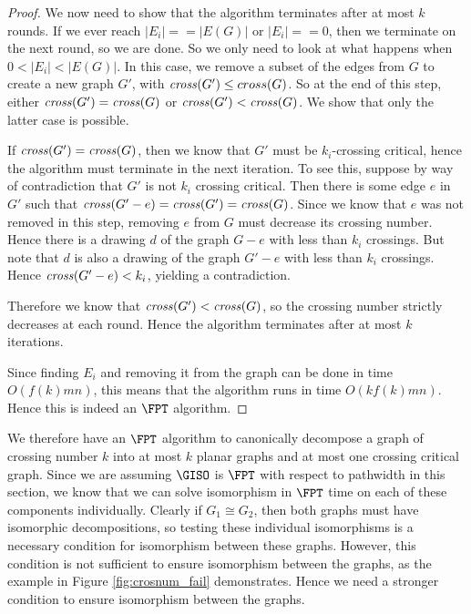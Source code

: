 \documentclass[11pt]{report}
\newcommand{\cross}{\mbox{\emph{cross}}}
\begin{document}
\begin{proof}
We now need to show that the algorithm terminates after at most $k$ rounds. If we ever reach $|E_i|==|E(G)|$ or $|E_i|==0$, then we terminate on the next round, so we are done. So we only need to look at what happens when  $0<|E_i|<|E(G)|$.  In this case,  we remove a subset of the edges from $G$ to create a new graph $G'$, with $\cross(G')\leq cross(G)$. So at the end of this step, either $\cross(G')=\cross(G)$ or $\cross(G')<\cross(G)$. We show that only the latter case is possible.

If $\cross(G')=\cross(G)$, then we know that $G'$ must be $k_i$-crossing critical, hence the algorithm must terminate in the next iteration. To see this, suppose by way of contradiction that $G'$ is not $k_i$ crossing critical. Then there is some edge $e$ in $G'$ such that $\cross(G'-e)=\cross(G')=\cross(G)$. Since we know that $e$ was not removed in this step, removing $e$ from $G$ must decrease its crossing number. Hence there is a drawing $d$ of the graph $G-e$ with less than $k_i$ crossings. But note that $d$ is also a drawing of the graph $G'-e$ with less than $k_i$ crossings. Hence $\cross(G'-e)<k_i$, yielding a contradiction. 


Therefore we know that $\cross(G')<\cross(G)$, so the crossing number strictly decreases at each round. Hence the algorithm terminates after at most $k$ iterations.

Since finding $E_i$ and removing it from the graph can be done in time $O(f(k)mn)$, this means that the algorithm runs in time $O(kf(k)mn)$. Hence this is indeed an $\FPT$ algorithm.

\end{proof}

We therefore have an $\FPT$ algorithm to canonically decompose a graph of crossing number $k$ into at most $k$ planar graphs and at most one crossing critical graph. Since we are assuming $\GISO$ is $\FPT$ with respect to pathwidth in this section, we know that we can solve isomorphism in $\FPT$ time on each of these components individually. Clearly if $G _1 \cong G_2$, then both graphs must have isomorphic decompositions, so testing these individual isomorphisms is a necessary condition for isomorphism between these graphs. However, this condition is not sufficient to ensure isomorphism between the graphs, as the example in Figure \ref{fig:crosnum_fail} demonstrates. Hence we need a stronger condition to ensure isomorphism between the graphs. 
\end{document}
